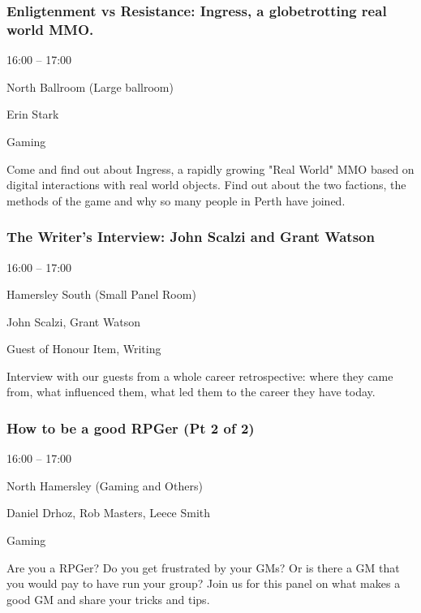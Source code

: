 \documentclass{scrreprt}
\begin{document}
\begin{multicols}{2}
\subsubsection*{Enligtenment vs Resistance: Ingress, a globetrotting real world MMO.}\begin{description}
\setlength{\itemsep}{0pt}
\setlength{\parsep}{0pt}
\setlength{\parskip}{0pt}
\item[Time:]{16:00 -- 17:00}
\item[Venue:]{North Ballroom (Large ballroom)}
\item[People:]{Erin Stark}
\item[Tags:]{Gaming}\end{description}
Come and find out about Ingress, a rapidly growing "Real World" MMO based on digital interactions with real world objects. Find out about the two factions, the methods of the game and why so many people in Perth have joined.
\subsubsection*{The Writer's Interview: John Scalzi and Grant Watson}\begin{description}
\setlength{\itemsep}{0pt}
\setlength{\parsep}{0pt}
\setlength{\parskip}{0pt}
\item[Time:]{16:00 -- 17:00}
\item[Venue:]{Hamersley South (Small Panel Room)}
\item[People:]{John Scalzi, Grant Watson}
\item[Tags:]{Guest of Honour Item, Writing}\end{description}
Interview with our guests from a whole career retrospective: where they came from, what influenced them, what led them to the career they have today.
\subsubsection*{How to be a good RPGer (Pt 2 of 2)}\begin{description}
\setlength{\itemsep}{0pt}
\setlength{\parsep}{0pt}
\setlength{\parskip}{0pt}
\item[Time:]{16:00 -- 17:00}
\item[Venue:]{North Hamersley (Gaming and Others)}
\item[People:]{Daniel Drhoz, Rob Masters, Leece Smith}
\item[Tags:]{Gaming}\end{description}
Are you a RPGer? Do you get frustrated by your GMs? Or is there a GM that you would pay to have run your group? Join us for this panel on what makes a good GM and share your tricks and tips.

\end{multicols}
\end{document}
